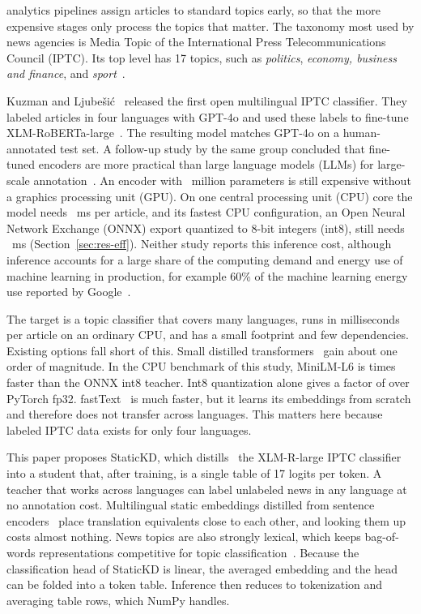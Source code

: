  analytics pipelines assign articles to standard topics early, so that the more expensive stages only process the topics that matter. The taxonomy most used by news agencies is Media Topic of the International Press Telecommunications Council (IPTC). Its top level has 17 topics, such as \emph{politics}, \emph{economy, business and finance}, and \emph{sport}~\cite{iptc2024mediatopics,kuzman2025llm}.

Kuzman and Ljube\v{s}i\'c~\cite{kuzman2025llm} released the first open multilingual IPTC classifier. They labeled articles in four languages with GPT-4o and used these labels to fine-tune XLM-RoBERTa-large~\cite{conneau2020xlmr}. The resulting model matches GPT-4o on a human-annotated test set. A follow-up study by the same group concluded that fine-tuned encoders are more practical than large language models (LLMs) for large-scale annotation~\cite{kuzman2025southslavic}. An encoder with ~million parameters is still expensive without a graphics processing unit (GPU). On one central processing unit (CPU) core the model needs ~ms per article, and its fastest CPU configuration, an Open Neural Network Exchange (ONNX) export quantized to 8-bit integers (int8), still needs ~ms (Section~\ref{sec:res-eff}). Neither study reports this inference cost, although inference accounts for a large share of the computing demand and energy use of machine learning in production, for example 60\% of the machine learning energy use reported by Google~\cite{luccioni2024power}.

The target is a topic classifier that covers many languages, runs in milliseconds per article on an ordinary CPU, and has a small footprint and few dependencies. Existing options fall short of this. Small distilled transformers~\cite{sanh2019distilbert,wang2021minilmv2} gain about one order of magnitude. In the CPU benchmark of this study, MiniLM-L6 is  times faster than the ONNX int8 teacher. Int8 quantization alone gives a factor of  over PyTorch fp32. fastText~\cite{joulin2017bag} is much faster, but it learns its embeddings from scratch and therefore does not transfer across languages. This matters here because labeled IPTC data exists for only four languages.

This paper proposes StaticKD, which distills~\cite{hinton2015distilling} the XLM-R-large IPTC classifier into a student that, after training, is a single table of 17 logits per token. A teacher that works across languages can label unlabeled news in any language at no annotation cost. Multilingual static embeddings distilled from sentence encoders~\cite{tulkens2024model2vec,wada2025static,chen2024bgem3} place translation equivalents close to each other, and looking them up costs almost nothing. News topics are also strongly lexical, which keeps bag-of-words representations competitive for topic classification~\cite{galke2022bow}. Because the classification head of StaticKD is linear, the averaged embedding and the head can be folded into a token table. Inference then reduces to tokenization and averaging table rows, which NumPy handles.

